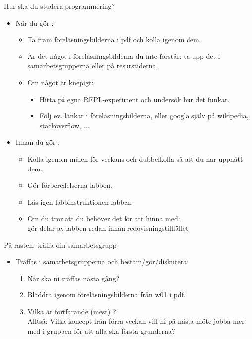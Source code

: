 \begin{Slide}{Hur ska du studera programmering?}
\begin{itemize}
\item När du gör :
\begin{itemize}
\item Ta fram föreläsningsbilderna i pdf och kolla igenom dem.
\item Är det något i föreläsningsbilderna du inte förstår: ta upp det i samarbetsgrupperna eller på resurstiderna.
\item Om något är knepigt: 
\begin{itemize}
\item Hitta på egna REPL-experiment och undersök hur det funkar.
\item Följ ev. länkar i föreläsningsbilderna, eller googla själv på wikipedia, stackoverflow, ...
\end{itemize}
\end{itemize}

\item Innan du gör :
\begin{itemize}
\item Kolla igenom målen för veckans  och dubbelkolla så att du har uppnått dem.
\item Gör förberedelserna  labben.
\item Läs igen  labbinstruktionen  labben.
\item Om du tror att du behöver det för att hinna med: \\ gör delar av labben redan innan redovisningstillfället.
\end{itemize}
\end{itemize}



\end{Slide}

\begin{Slide}{På rasten: träffa din samarbetsgrupp}
\begin{itemize}

\item Träffas i samarbetsgrupperna och bestäm/gör/diskutera:
\begin{enumerate}
\item När ska ni träffas nästa gång?
\item Bläddra igenom föreläsningsbilderna från w01 i pdf.
\item Vilka  är fortfarande (mest) ? \\Alltså: Vilka koncept från förra veckan vill ni på nästa möte jobba mer med i gruppen för att alla ska förstå grunderna?
\end{enumerate}

\end{itemize}

\end{Slide}


